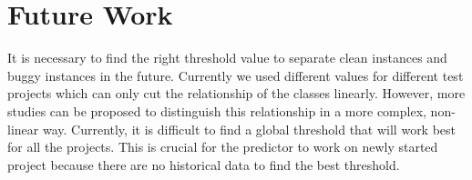 
\section{Future Work}
It is necessary to find the right threshold value to separate clean instances and buggy instances in the future.
Currently we used different values for different test projects which can only cut the relationship of the classes linearly.
However, more studies can be proposed to distinguish this relationship in a more complex, non-linear way.
Currently, it is difficult to find a global threshold that will work best for all the projects.
This is crucial for the predictor to work on newly started project because there are no historical data to find the best threshold.


